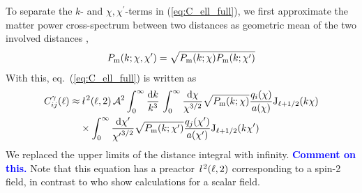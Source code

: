 \documentclass[fleqn,usenatbib]{mnras} %
\newcommand{\ellbar}{\hbox{\it \l}\,}
\newcommand{\pref}{{\cal A}}
\newcommand{\mk}[1]{{\bf\textcolor{blue}{#1}}}
\begin{document}
To separate the $k$- and $\chi, \chi^\prime$-terms in (\ref{eq:C_ell_full}), we
first approximate the matter power cross-spectrum between two distances as
geometric mean of the two involved distances \cite{2005PhRvD..72b3516C,2016arXiv161200770K},
%
\begin{equation}
 P_{\rm m}(k; \chi, \chi^\prime) = \sqrt{ P_{\rm m}(k; \chi) P_{\rm m}(k; \chi^\prime) }
  \label{eq:P_geom_mean}
\end{equation}
%
With this, eq.~(\ref{eq:C_ell_full}) is written as
%
\begin{align}
  C^\gamma_{ij}(\ell) \approx & \, \ellbar^2(\ell, 2) \, \pref^2
                \int_0^\infty \frac{{\rm d} k}{k^3} \,
                \int_{0}^\infty \frac{{\rm d} \chi}{\chi^{3/2}} \sqrt{P_{\rm m}(k; \chi)}
                \frac{q_i(\chi)}{a(\chi)} {\rm J}_{\ell+1/2}(k \chi)
                \nonumber \\
                 & \times
                \int_{0}^\infty \frac{{\rm d} \chi^\prime}{{\chi^\prime}^{3/2}}
                \sqrt{P_{\rm m}(k; \chi^\prime)} \frac{q_j(\chi^\prime)}{a(\chi^\prime)} {\rm J}_{\ell+1/2}(k \chi^\prime)
  \label{eq:C_ell_full_Pk}
\end{align}
%
We replaced the upper limits of the distance integral with infinity. \mk{Comment on this.}
Note that this equation has a preactor $\ellbar^2(\ell, 2)$ corresponding to a spin-2 field, in contrast
to \cite{2008PhRvD..78l3506L} who show calculations for a scalar field.
\end{document}
